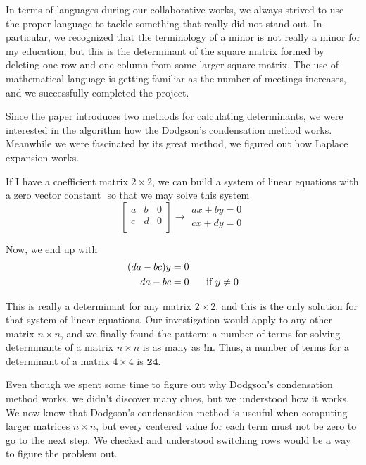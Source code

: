 \documentclass[12pt]{article}
\newcommand{\matxx}[2] {
\begin{bmatrix}
  #1 \\
  #2 \\
\end{bmatrix}
}
\newcommand{\arrow}[1] {\xrightarrow[]{\text{#1}}}
\begin{document}
In terms of languages during our collaborative works, we always strived to use the proper language to tackle something that really did not stand out. In particular, we recognized that the terminology of a minor is not really a minor for my education, but this is the determinant of the square matrix formed by deleting one row and one column from some larger square matrix. The use of mathematical language is getting familiar as the number of meetings increases, and we successfully completed the project.

Since the paper introduces two methods for calculating determinants,
we were interested in the algorithm how the Dodgson's condensation method works.
Meanwhile we were fascinated by its great method, we figured out how Laplace expansion works.

If I have a coefficient matrix \(2 \times 2\), we can build a system of linear equations with a zero vector constant \(\)
so that we may solve this system
\[
  \matxx{a & b & 0}{c & d & 0}
  \arrow{}
  \begin{matrix}
    ax + by = 0 \\
    cx + dy = 0
  \end{matrix}
\]

Now, we end up with
\[
  \begin{split}
    (da - bc)y  & = 0 \\
    da - bc & = 0 \hspace{0.5cm} \mbox{ if } y \neq 0
  \end{split}
\]

\noindent This is really a determinant for any matrix \(2 \times 2\), and this is the only solution
for that system of linear equations. Our investigation would apply to any other matrix \(n \times n\), and we finally found the pattern:
a number of terms for solving determinants of a matrix \(n \times n\) is as many as \(\mathbf{!n}\). Thus, a number of terms for a determinant of a matrix \(4 \times 4\) is \(\mathbf{24}\).

\bigskip

\noindent Even though we spent some time to figure out why Dodgson's condensation method works,
we didn't discover many clues, but we understood how it works. We now know that
Dodgson's condensation method is useuful when computing larger matrices \(n \times n\), but
every centered value for each term must not be zero to go to the next step. We checked and understood switching rows would be a way to
figure the problem out.

\bigskip
\end{document}
